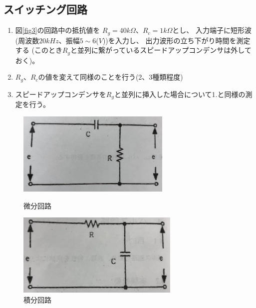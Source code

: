 \documentclass[12pt]{jarticle}
\begin{document}
\subsection{スイッチング回路}
\begin{enumerate}
    \item 図\ref{fig3}の回路中の抵抗値を
          $R_g = 40k\Omega$、$R_c = 1k\Omega$とし、
          入力端子に短形波(周波数$20kHz$、振幅$5\sim6$($V$))を入力し、
          出力波形の立ち下がり時間を測定する
          (このとき$R_g$と並列に繋がっているスピードアップコンデンサは外しておく)。
    \item $R_g$、$R_c$の値を変えて同様のことを行う(2、3種類程度)
    \item スピードアップコンデンサを$R_g$と並列に挿入した場合について1.と同様の測定を行う。
\end{enumerate}

\clearpage

\begin{figure}[h]
    \begin{minipage}{0.5\hsize}
        \begin{center}
            \includegraphics[bb=0 0 2765 1504,height=4cm]{parusu_1.jpg}
        \end{center}
        \caption{微分回路}
        \label{fig1}
    \end{minipage}
    \begin{minipage}{0.5\hsize}
        \begin{center}
            \includegraphics[bb= 0 0 2730 1404,height=4cm]{parusu_2.jpg}
        \end{center}
        \caption{積分回路}
        \label{fig2}
    \end{minipage}
\end{figure}
\end{document}
